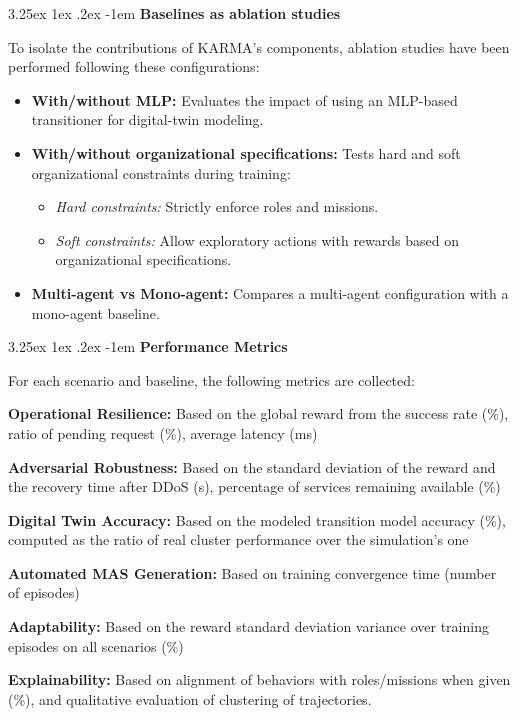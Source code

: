 \documentclass[conference]{IEEEtran}
\makeatletter
\renewcommand\paragraph{\@startsection{paragraph}{5}{\z@}%
  {3.25ex \@plus1ex \@minus.2ex}%
  {-1em}%
  {\normalfont\normalsize\bfseries}}
\makeatother
\begin{document}
\paragraph{\textbf{Baselines as ablation studies}}

\noindent To isolate the contributions of KARMA's components, ablation studies have been performed following these configurations:
%
\begin{itemize}
    \item \textbf{With/without MLP:} Evaluates the impact of using an MLP-based transitioner for digital-twin modeling.
    \item \textbf{With/without organizational specifications:} Tests hard and soft organizational constraints during training:
          \begin{itemize}
              \item \textit{Hard constraints:} Strictly enforce roles and missions.
              \item \textit{Soft constraints:} Allow exploratory actions with rewards based on organizational specifications.
          \end{itemize}
    \item \textbf{Multi-agent vs Mono-agent:} Compares a multi-agent configuration with a mono-agent baseline.
\end{itemize}

\paragraph{\textbf{Performance Metrics}}

\noindent For each scenario and baseline, the following metrics are collected:
%
\begin{enumerate*}[label=\textbf{\arabic*)}, itemjoin={;\quad }]
    \item \textbf{Operational Resilience:} Based on the global reward from the success rate (\%), ratio of pending request (\%), average latency (ms)
    \item \textbf{Adversarial Robustness:} Based on the standard deviation of the reward and the recovery time after DDoS (s), percentage of services remaining available (\%)
    \item \textbf{Digital Twin Accuracy:} Based on the modeled transition model accuracy (\%), computed as the ratio of real cluster performance over the simulation's one
    \item \textbf{Automated MAS Generation:} Based on training convergence time (number of episodes)
    \item \textbf{Adaptability:} Based on the reward standard deviation variance over training episodes on all scenarios (\%)
    \item \textbf{Explainability:} Based on alignment of behaviors with roles/missions when given (\%), and qualitative evaluation of clustering of trajectories.
\end{enumerate*}
\end{document}
